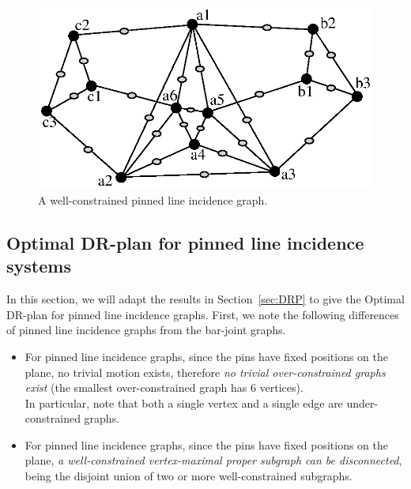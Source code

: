 \begin{figure}
  \centering
   \includegraphics[width=.8\linewidth]{img/pinned}
\caption{ A well-constrained pinned line incidence graph.}
\label{fig:pinned_line}
\end{figure}


\subsection{Optimal DR-plan for pinned line incidence systems}


In this section, we will adapt the results in Section~\ref{sec:DRP}
to give the Optimal DR-plan for pinned line incidence graphs.
First, we note the following differences of pinned line incidence graphs from the bar-joint graphs.

\begin{itemize}

\item For pinned line incidence graphs,
since the pins have fixed positions on the plane,
no trivial motion exists, therefore {\em no trivial over-constrained graphs exist} (the smallest over-constrained graph has $6$ vertices).\\
In particular, note that both a single vertex and a single edge are under-constrained graphs.

\item
For pinned line incidence graphs,
since the pins have fixed positions on the plane,
{\em a well-constrained vertex-maximal proper subgraph can be disconnected},
being the disjoint union of two or more well-constrained subgraphs. \\

\end{itemize}

